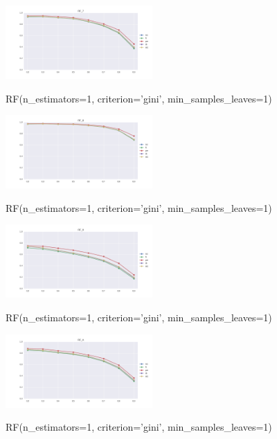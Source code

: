 \documentclass{sig-alternate-05-2015}
\begin{document}
\begin{figure}[]
  \centering
  \caption{RF(n\_estimators=1, criterion='gini', min\_samples\_leaves=1)}
  \includegraphics[width=0.5\textwidth]{../plots/RF_7}
  \label{fig:anomalySetup}
\end{figure}

\begin{figure}[]
  \centering
  \caption{RF(n\_estimators=1, criterion='gini', min\_samples\_leaves=1)}
  \includegraphics[width=0.5\textwidth]{../plots/RF_8}
  \label{fig:anomalySetup}
\end{figure}

\begin{figure}[]
  \centering
  \caption{RF(n\_estimators=1, criterion='gini', min\_samples\_leaves=1)}
  \includegraphics[width=0.5\textwidth]{../plots/RF_9}
  \label{fig:anomalySetup}
\end{figure}

\begin{figure}[]
  \centering
  \caption{RF(n\_estimators=1, criterion='gini', min\_samples\_leaves=1)}
  \includegraphics[width=0.5\textwidth]{../plots/RF_A}
  \label{fig:anomalySetup}
\end{figure}
\end{document}

